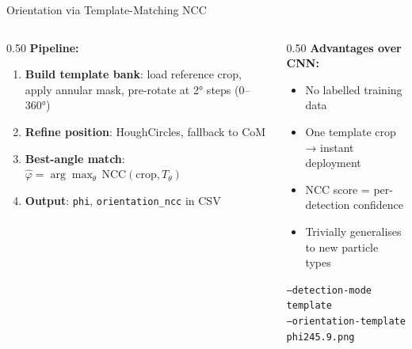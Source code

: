 \begin{frame}{Orientation via Template-Matching NCC}
\begin{columns}
\begin{column}{0.50\textwidth}
\textbf{Pipeline:}
\begin{enumerate}\footnotesize
    \item \textbf{Build template bank}:
          load reference crop, apply annular mask,
          pre-rotate at 2° steps (0–360°)
    \item \textbf{Refine position}:
          HoughCircles, fallback to CoM
    \item \textbf{Best-angle match}:
          $\hat{\varphi} = \arg\max_\theta\, \mathrm{NCC}(\text{crop}, T_\theta)$
    \item \textbf{Output}: \texttt{phi}, \texttt{orientation\_ncc} in CSV
\end{enumerate}
\end{column}
\begin{column}{0.50\textwidth}
\textbf{Advantages over CNN:}
\begin{itemize}\footnotesize
    \item No labelled training data
    \item One template crop → instant deployment
    \item NCC score = per-detection confidence
    \item Trivially generalises to new particle types
\end{itemize}
\begin{mynote}
\footnotesize\texttt{--detection-mode template}\\
\texttt{--orientation-template phi245.9.png}
\end{mynote}
\end{column}
\end{columns}
\end{frame}

